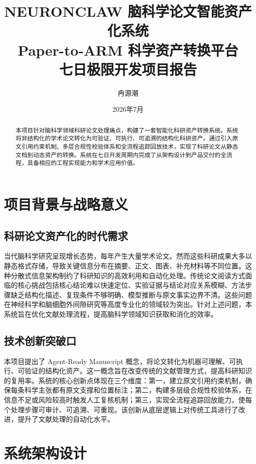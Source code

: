 ﻿\documentclass[a4paper,12pt]{article}
\title{\textbf{NEURONCLAW 脑科学论文智能资产化系统} \\ \large Paper-to-ARM 科学资产转换平台 \\ \normalsize 七日极限开发项目报告}
\author{冉源潮}
\date{2026年7月}
\begin{document}
\maketitle

\begin{abstract}
本项目针对脑科学领域科研论文处理痛点，构建了一套智能化科研资产转换系统。系统将非结构化的学术论文转化为可验证、可执行、可追溯的结构化科研资产。通过引入原文引用约束机制、多层合规性校验体系和全流程追踪回放技术，实现了科研论文从静态文档到动态资产的转换。系统在七日开发周期内完成了从架构设计到产品交付的全流程，具备相应的工程实现能力和学术应用价值。
\end{abstract}

\tableofcontents
\newpage

\section{项目背景与战略意义}

\subsection{科研论文资产化的时代需求}

当代脑科学研究呈现增长态势，每年产生大量学术论文。然而这些科研成果大多以静态格式存储，导致关键信息分布在摘要、正文、图表、补充材料等不同位置。这种分散式信息架构制约了科研知识的高效利用和自动化处理。传统论文阅读方式面临的核心挑战包括核心结论难以快速定位、实验证据与结论对应关系模糊、方法步骤缺乏结构化描述、复现条件不够明确、模型推断与原文事实边界不清。这些问题在神经科学和脑细胞外间隙研究等高度专业化的领域较为突出。针对上述问题，本系统旨在优化文献处理流程，提高脑科学领域知识获取和消化的效率。

\subsection{技术创新突破口}

本项目提出了 Agent-Ready Manuscript 概念，将论文转化为机器可理解、可执行、可验证的结构化资产。这一概念旨在改变传统的文献管理方式，提高科研知识的复用率。系统的核心创新点体现在三个维度：第一，建立原文引用约束机制，确保每条科学主张都有原文支撑和位置标注；第二，构建多层级合规性校验体系，在信息不足或风险较高时触发人工复核机制；第三，实现全流程追踪回放能力，使每个处理步骤可审计、可追溯、可重现。该创新从底层逻辑上对传统工具进行了改进，提升了文献处理的自动化水平。

\section{系统架构设计}
\end{document}
